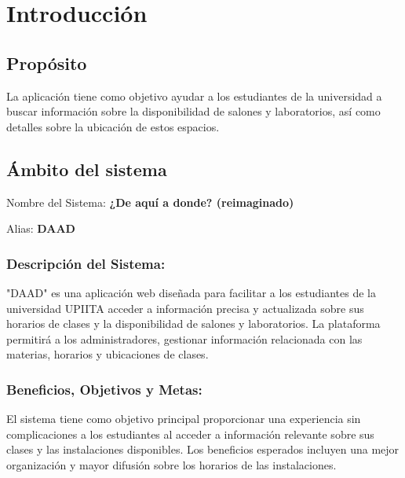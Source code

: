 
\section{Introducción}

\subsection{Propósito}
La aplicación tiene como objetivo ayudar a los estudiantes de la universidad a buscar información sobre la disponibilidad de salones y laboratorios, así como detalles sobre la ubicación de estos espacios.

\subsection{Ámbito del sistema}

Nombre del Sistema: \textbf{¿De aquí a donde? (reimaginado)}

Alias: \textbf{DAAD}

\subsubsection{Descripción del Sistema:}

"DAAD" es una aplicación web diseñada para facilitar a los estudiantes de la universidad UPIITA acceder a información precisa y actualizada sobre sus horarios de clases y la disponibilidad de salones y laboratorios. La plataforma permitirá a los administradores, gestionar información relacionada con las materias, horarios y ubicaciones de clases.


\subsubsection{Beneficios, Objetivos y Metas:}

El sistema tiene como objetivo principal proporcionar una experiencia sin complicaciones a los estudiantes al acceder a información relevante sobre sus clases y las instalaciones disponibles. Los beneficios esperados incluyen una mejor organización y mayor difusión sobre los horarios de las instalaciones.







